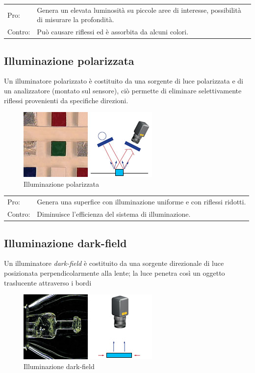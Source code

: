 \begin{centering}

\begin{tabularx}{\textwidth}{l p{}}
Pro: &  Genera un elevata luminosità su piccole aree di interesse, possibilità di misurare la profondità.\\
Contro: &  Può causare riflessi ed è assorbita da alcuni colori.\\
\end{tabularx}
\end{centering}

\subsection{Illuminazione polarizzata}
Un illuminatore polarizzato è costituito da una sorgente di luce polarizzata e di
un analizzatore (montato sul sensore), ciò permette di eliminare selettivamente
riflessi provenienti da specifiche direzioni.

\begin{figure}[!h]
\centering
\includegraphics[width=.3\textwidth]{img/illuminazione-polarizzata.jpg}
\caption{Illuminazione polarizzata}\label{fig:illuminazione-polarizzata}
\end{figure}

\begin{centering}

\begin{tabular}{l l}
Pro: &  Genera una superfice con illuminazione uniforme e con riflessi ridotti.\\
Contro: &  Diminuisce l'efficienza del sistema di illuminazione.\\
\end{tabular}
\end{centering}

\subsection{Illuminazione dark-field}
Un illuminatore \emph{dark-field} è costituito da una sorgente direzionale di luce posizionata perpendicolarmente
alla lente; la luce penetra così un oggetto traslucente attraverso i bordi

\begin{figure}[!h]
\centering
\includegraphics[width=.3\textwidth]{img/illuminazione-darkfield.jpg}
\caption{Illuminazione dark-field}\label{fig:illuminazione-darkfield}
\end{figure}

